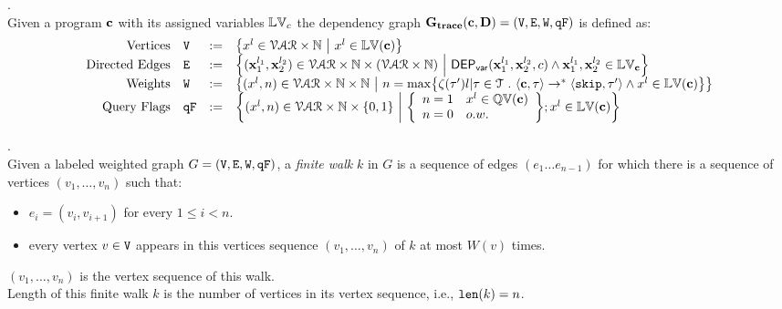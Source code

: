 %
%
\begin{defn}.
\\
Given a program ${\boldsymbol{\mathbf{c}}}$ with its assigned variables $\mathbb{LV}_c$ 
the dependency graph $\bf{G_{trace}}({\boldsymbol{\mathbf{c}}}, D) = (\mathtt{V}, \mathtt{E}, \mathtt{W}, \mathtt{qF})$ is defined as:
%
\[
\begin{array}{rlcl}
  \text{Vertices} &
  \vertxs & := & \left\{ 
  x^l \in \mathcal{VAR} \times \mathbb{N}
  ~ \middle\vert ~
  x^l \in \lvar({\ssa{c}})
  \right\}
  \\
  \text{Directed Edges} &
  \edges & := & 
  \left\{ 
  (\ssa{x}_1^{l_1}, \ssa{x}_2^{l_2}) \in \mathcal{VAR} \times \mathbb{N} \times (\mathcal{VAR} \times \mathbb{N})
  ~ \middle\vert ~
  \vardep(\ssa{x}_1^{l_1}, \ssa{x}_2^{l_2}, c) \land
  \ssa{x}_1^{l_1}, \ssa{x}_2^{l_2} \in \lvar_{\ssa{c}}
  \right\}
  \\
  \text{Weights} &
  \weights & := & 
  \left\{ 
  (x^l, n) \in \mathcal{VAR} \times \mathbb{N} \times \mathbb{N}
  ~ \middle\vert ~ 
  n = \max \left\{ \vcounter(\vtrace')l | \vtrace \in \mathcal{T} \st 
   \config{\ssa{c}, \trace} \to^{*} \config{\eskip, \vtrace'}  
   \land x^l \in \lvar({\ssa{c}}) 
   \right\}
  \right\}
  \\
  \text{Query Flags} &
  \qflag & := & 
  \left\{(x^l, n)  \in \mathcal{VAR} \times \mathbb{N}  \times \{0, 1\} 
  ~ \middle\vert ~
  \left\{
  \begin{array}{ll}
  n = 1 & x^l \in \qvar({\ssa{c}}) \\ 
  n = 0 & o.w.
  \end{array}
  \right\};
  x^l \in \lvar({\ssa{c}})
  \right\}
\end{array}
\]
\end{defn}
%
%
\begin{defn}.
\label{def:finitewalk}
\\
Given a labeled weighted graph $G = (\mathtt{V}, \mathtt{E}, \mathtt{W}, \mathtt{qF})$, a \emph{finite walk} $k$ in $G$ is a sequence of edges $(e_1 \ldots e_{n - 1})$ 
for which there is a sequence of vertices $(v_1, \ldots, v_{n})$ such that:
\begin{itemize}
    \item $e_i = (v_{i},v_{i + 1})$ for every $1 \leq i < n$.
    \item every vertex $v \in \mathtt{V}$ appears in this vertices sequence $(v_1, \ldots, v_{n})$ of $k$ at most $W(v)$ times.  
\end{itemize}
$(v_1, \ldots, v_{n})$ is the vertex sequence of this walk.
\\
%
Length of this finite walk $k$ is the number of vertices in its vertex sequence, i.e., $\mathtt{len}(k) = n$.
\end{defn}
